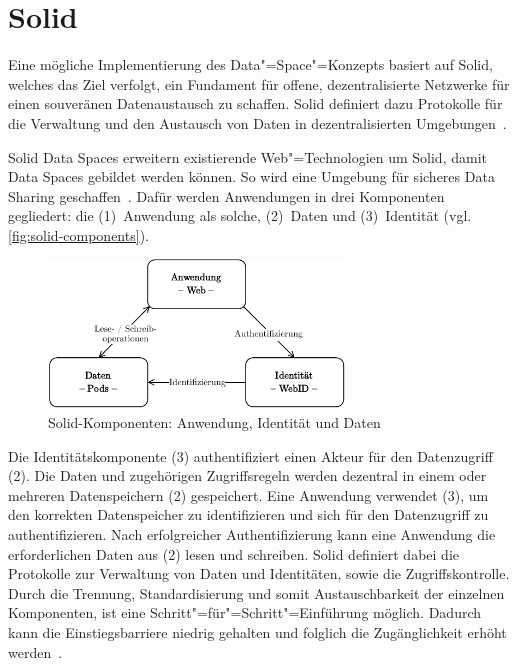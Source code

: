
\section{Solid}

Eine mögliche Implementierung des Data"=Space"=Konzepts basiert auf Solid, welches das Ziel verfolgt, ein Fundament für offene, dezentralisierte Netzwerke für einen souveränen Datenaustausch zu schaffen.
Solid definiert dazu Protokolle für die Verwaltung und den Austausch von Daten in dezentralisierten Umgebungen~\cite{mecklerWebLinkedData2023}.

Solid Data Spaces erweitern existierende Web"=Technologien um Solid, damit Data Spaces gebildet werden können.
So wird eine Umgebung für sicheres Data Sharing geschaffen~\cite{mecklerWebLinkedData2023}.
Dafür werden Anwendungen in drei Komponenten gegliedert: die (1)~Anwendung als solche, (2)~Daten und (3)~Identität (vgl. \autoref{fig:solid-components}).

\begin{figure}[t]
    \includegraphics[width=0.7\textwidth]{./assets/solid_triangle.drawio.pdf}
    \caption{Solid-Komponenten: Anwendung, Identität und Daten}
    \label{fig:solid-components}
\end{figure}

Die Identitätskomponente (3) authentifiziert einen Akteur für den Datenzugriff (2).
Die Daten und zugehörigen Zugriffsregeln werden dezentral in einem oder mehreren Datenspeichern (2) gespeichert.
Eine Anwendung verwendet (3), um den korrekten Datenspeicher zu identifizieren und sich für den Datenzugriff zu authentifizieren.
Nach erfolgreicher Authentifizierung kann eine Anwendung die erforderlichen Daten aus (2) lesen und schreiben.
Solid definiert dabei die Protokolle zur Verwaltung von Daten und Identitäten, sowie die Zugriffskontrolle.
Durch die Trennung, Standardisierung und somit Austauschbarkeit der einzelnen Komponenten, ist eine Schritt"=für"=Schritt"=Einführung möglich.
Dadurch kann die Einstiegsbarriere niedrig gehalten und folglich die Zugänglichkeit erhöht werden~\cite{mecklerWebLinkedData2023}.



